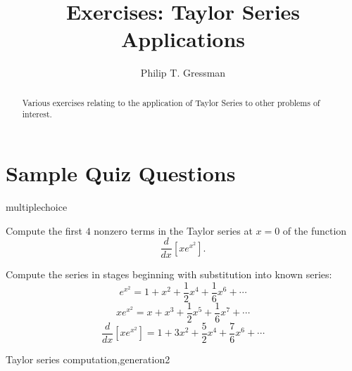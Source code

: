 \documentclass{ximera}
\title{Exercises: Taylor Series Applications}
\author{Philip T. Gressman}
\begin{document}
\begin{abstract}
Various exercises relating to the application of Taylor Series to other problems of interest.
\end{abstract}
\maketitle

\section*{Sample Quiz Questions}

\begin{question}[TaylorExpand001]
\begin{type}
multiplechoice
\end{type}
Compute the first \(4\) nonzero terms in the Taylor series 
at \(x=0\) of the function \[\frac{d}{dx} \left[ x e^{x^2} \right].\]
\begin{multiplechoice}
\end{multiplechoice}
\begin{feedback}
Compute the series in stages beginning with substitution into known series:
\[e^{x^2} = 1 + x^{2} + \frac{1}{2}x^{4} + \frac{1}{6}x^{6} + \cdots \]
\[x e^{x^2} = x + x^{3} + \frac{1}{2}x^{5} + \frac{1}{6}x^{7} + \cdots \]
\[\frac{d}{dx} \left[ x e^{x^2} \right] = 1 + 3x^{2} + \frac{5}{2}x^{4} + \frac{7}{6}x^{6} + \cdots \]
\end{feedback}
\begin{keywords}
Taylor series computation,generation2
\end{keywords}
\end{question}
\end{document}
